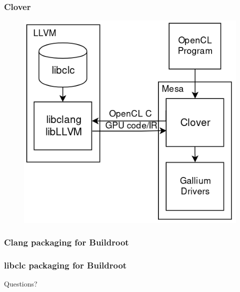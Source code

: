 \documentclass{beamer}
\begin{document}
\begin{frame}
\frametitle{Clover}
\begin{figure}
\includegraphics[width=0.7\linewidth]{img/clover.png}
\end{figure}
\end{frame}

\begin{frame}
\frametitle{Clang packaging for Buildroot}
\begin{itemize}

\end{itemize}
\end{frame}

\begin{frame}
\frametitle{libclc packaging for Buildroot}
\begin{itemize}

\end{itemize}
\end{frame}

\begin{frame}
\Huge{\centerline{Questions?}}
\end{frame}
\end{document}

